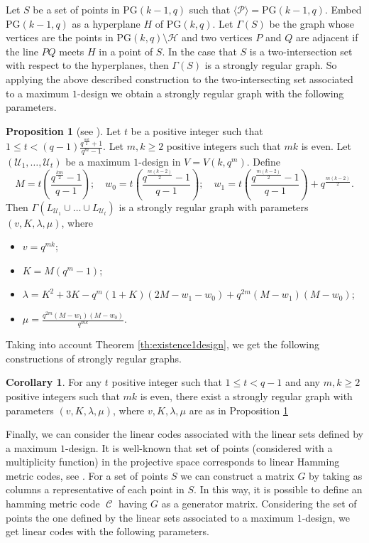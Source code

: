 \documentclass[11pt]{amsart}
\DeclareMathOperator{\C}{\mathcal{C}}
\theoremstyle{definition}
\newtheorem{corollary}[theorem]{Corollary}
\newtheorem{proposition}[theorem]{Proposition}
\newcommand{\U}{{\mathcal{U}}}
\newcommand{\PG}{\mathrm{PG}}
\begin{document}
Let $S$ be a set of points in $\PG(k-1,q)$ such that $\langle \mathcal{P} \rangle=\PG(k-1,q)$.
Embed $\PG(k-1,q)$ as a hyperplane $H$ of $\PG(k,q)$.
Let $\Gamma(S)$ be the graph whose vertices are the points in $\PG(k,q)\setminus \mathcal{H}$ and two vertices $P$ and $Q$ are adjacent if the line $PQ$ meets $H$ in a point of $S$.
In the case that $S$ is a two-intersection set with respect to the hyperplanes, then $\Gamma(S)$ is a strongly regular graph. 
So applying the above described construction to the two-intersecting set associated to a maximum $1$-design we obtain a strongly regular graph with the following parameters.

\begin{proposition}
[see \textnormal{\cite[Corollary 5.27]{santonastaso2022subspace}}]   \label{cor:srg}
Let $t$ be a positive integer such that $1\leq t <(q-1)\frac{q^ {\frac{mk}{2}}+1}{q^m-1}$. Let $m,k \geq 2$ positive integers such that $mk$ is even. Let $(\U_1,\ldots,\U_t)$ be a maximum $1$-design in $V=V(k,q^m)$.
Define $$
M=t\left(\frac{q^{\frac{km}2}-1}{q-1}\right);\quad w_0=t \left(\frac{q^{\frac{m(k-2)}{2}}-1}{q-1}\right); \quad w_1=t \left(\frac{q^{\frac{m(k-2)}{2}}-1}{q-1}\right)+q^{\frac{m(k-2)}{2}}.
$$
Then $\Gamma(L_{\U_1}\cup\ldots\cup L_{\U_t})$ is a strongly regular graph with parameters $(v,K,\lambda,\mu)$, where
\begin{itemize}
    \item $v=q^{mk}$;
    \item $K=M(q^m-1)$;
    \item $\lambda=K^2+3K-q^m(1+K)(2M-w_1-w_0)+q^{2m}(M-w_1)(M-w_0)$;
    \item $\mu=\frac{q^{2m}(M-w_1)(M-w_0)}{q^{mk}}$.
\end{itemize}
\end{proposition}

Taking into account Theorem \ref{th:existence1design}, we get the following constructions of strongly regular graphs.

\begin{corollary}
    For any $t$ positive integer such that $1\leq t <q-1$ and any $m,k \geq 2$ positive integers such that $mk$ is even, there exist a strongly regular graph with parameters $(v,K,\lambda,\mu)$, where $v,K,\lambda,\mu$ are as in Proposition \ref{cor:srg}
\end{corollary}






Finally, we can consider the linear codes associated with the linear sets defined by a maximum $1$-design. It is well-known that set of points (considered with a multiplicity function) in the projective space corresponds to linear Hamming metric codes, see \cite{vladut2007algebraic}. For a set of points $S$ we can construct a matrix $G$ by taking as columns a representative of each point in $S$. In this way, it is possible to define an hamming metric code $\C$ having $G$ as a generator matrix. Considering the set of points the one defined by the linear sets associated to a maximum $1$-design, we get linear codes with the following parameters.
\end{document}
